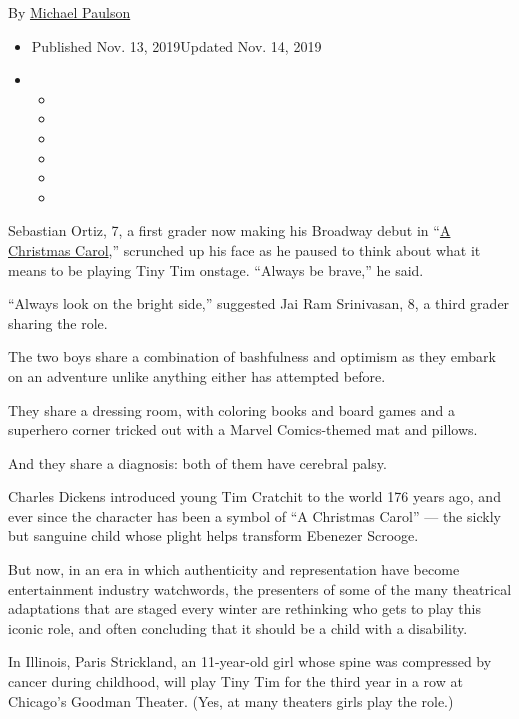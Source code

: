 By \href{https://www.nytimes3xbfgragh.onion/by/michael-paulson}{Michael
Paulson}

\begin{itemize}
\item
  Published Nov. 13, 2019Updated Nov. 14, 2019
\item
  \begin{itemize}
  \item
  \item
  \item
  \item
  \item
  \item
  \end{itemize}
\end{itemize}

Sebastian Ortiz, 7, a first grader now making his Broadway debut in
``\href{https://achristmascarolbroadway.com/}{A Christmas Carol},''
scrunched up his face as he paused to think about what it means to be
playing Tiny Tim onstage. ``Always be brave,'' he said.

``Always look on the bright side,'' suggested Jai Ram Srinivasan, 8, a
third grader sharing the role.

The two boys share a combination of bashfulness and optimism as they
embark on an adventure unlike anything either has attempted before.

They share a dressing room, with coloring books and board games and a
superhero corner tricked out with a Marvel Comics-themed mat and
pillows.

And they share a diagnosis: both of them have cerebral palsy.

Charles Dickens introduced young Tim Cratchit to the world 176 years
ago, and ever since the character has been a symbol of ``A Christmas
Carol'' --- the sickly but sanguine child whose plight helps transform
Ebenezer Scrooge.

But now, in an era in which authenticity and representation have become
entertainment industry watchwords, the presenters of some of the many
theatrical adaptations that are staged every winter are rethinking who
gets to play this iconic role, and often concluding that it should be a
child with a disability.

In Illinois, Paris Strickland, an 11-year-old girl whose spine was
compressed by cancer during childhood, will play Tiny Tim for the third
year in a row at Chicago's Goodman Theater. (Yes, at many theaters girls
play the role.)

